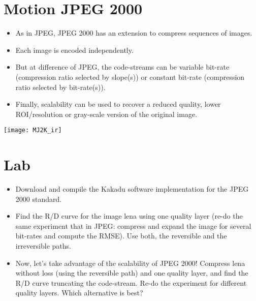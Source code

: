 \section{Motion JPEG 2000}
\begin{itemize}
\item As in JPEG, JPEG 2000 has an extension \cite{j2k-part3} to
  compress sequences of images.
\item Each image is encoded independently.
\item But at difference of JPEG, the code-streams can be variable
  bit-rate (compression ratio selected by slope(s)) or constant
  bit-rate (compression ratio selected by bit-rate(s)).
\item Finally, scalability can be used to recover a reduced quality,
  lower ROI/resolution or gray-scale version of the original image. 
\end{itemize}
\begin{center}
  \texttt{[image: MJ2K\_ir]}
\end{center}

\section*{Lab}
\begin{itemize}
\item Download and compile the Kakadu software implementation for the
  JPEG 2000 standard.
\item Find the R/D curve for the image lena using one quality layer
  (re-do the same experiment that in JPEG: compress and expand
  the image for several bit-rates and compute the RMSE). Use both, the
  reversible and the irreversible paths.
\item Now, let's take advantage of the scalability of JPEG 2000!
  Compress lena without loss (using the reversible path) and one
  quality layer, and find the R/D curve truncating the
  code-stream. Re-do the experiment for different quality
  layers. Which alternative is best?
\end{itemize}

